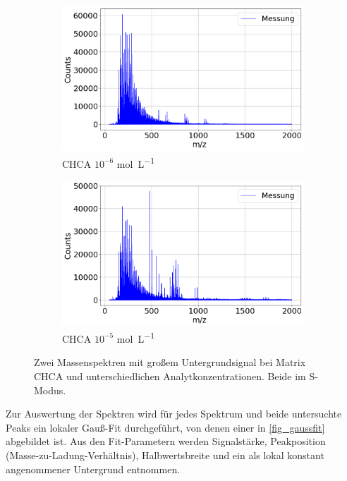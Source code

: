 \begin{figure}[!ht]
    \centering
    \begin{subfigure}{0.495\textwidth}
        \centering
        \includegraphics[width=1.0\textwidth]{img/b11_S_broken}
        \caption{CHCA $10^{-6}$ \si{\mole \per \liter}}
        \label{fig_very_broken}
    \end{subfigure}
    \begin{subfigure}{0.495\textwidth}
        \centering
        \includegraphics[width=1.0\textwidth]{img/C11_S_broken_but_fine}
        \caption{CHCA $10^{-5}$ \si{\mole \per \liter}}
        \label{fig_fine_broken}
    \end{subfigure}
    \caption{Zwei Massenspektren mit großem Untergrundsignal bei Matrix CHCA und unterschiedlichen Analytkonzentrationen. Beide im S-Modus.}
    \label{fig_broken}
\end{figure}

Zur Auswertung der Spektren wird für jedes Spektrum und beide untersuchte Peaks ein lokaler Gauß-Fit durchgeführt, von denen einer in \cref{fig_gaussfit} abgebildet ist.
Aus den Fit-Parametern werden Signalstärke, Peakposition (Masse-zu-Ladung-Verhältnis), Halbwertsbreite und ein als lokal konstant angenommener Untergrund entnommen.

